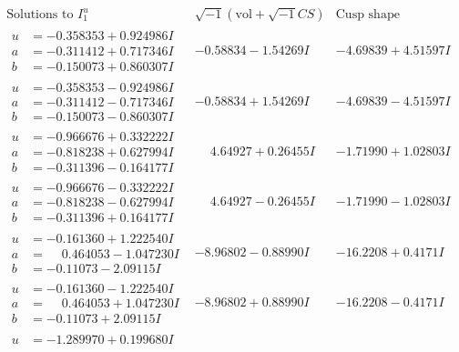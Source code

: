 \documentclass[1p]{elsarticle_modified}
\theoremstyle{definition}
\newcommand{\I}{\sqrt{-1}}
\begin{document}
$$\begin{array}{c|c|c}  
\text{Solutions to }I^u_{1}& \I (\text{vol} + \sqrt{-1}CS) & \text{Cusp shape}\\
 \hline 
\begin{aligned}
u &= -0.358353 + 0.924986 I \\
a &= -0.311412 + 0.717346 I \\
b &= -0.150073 + 0.860307 I\end{aligned}
 & -0.58834 - 1.54269 I & -4.69839 + 4.51597 I \\ \hline\begin{aligned}
u &= -0.358353 - 0.924986 I \\
a &= -0.311412 - 0.717346 I \\
b &= -0.150073 - 0.860307 I\end{aligned}
 & -0.58834 + 1.54269 I & -4.69839 - 4.51597 I \\ \hline\begin{aligned}
u &= -0.966676 + 0.332222 I \\
a &= -0.818238 + 0.627994 I \\
b &= -0.311396 - 0.164177 I\end{aligned}
 & \phantom{-}4.64927 + 0.26455 I & -1.71990 + 1.02803 I \\ \hline\begin{aligned}
u &= -0.966676 - 0.332222 I \\
a &= -0.818238 - 0.627994 I \\
b &= -0.311396 + 0.164177 I\end{aligned}
 & \phantom{-}4.64927 - 0.26455 I & -1.71990 - 1.02803 I \\ \hline\begin{aligned}
u &= -0.161360 + 1.222540 I \\
a &= \phantom{-}0.464053 - 1.047230 I \\
b &= -0.11073 - 2.09115 I\end{aligned}
 & -8.96802 - 0.88990 I & -16.2208 + 0.4171 I \\ \hline\begin{aligned}
u &= -0.161360 - 1.222540 I \\
a &= \phantom{-}0.464053 + 1.047230 I \\
b &= -0.11073 + 2.09115 I\end{aligned}
 & -8.96802 + 0.88990 I & -16.2208 - 0.4171 I \\ \hline\begin{aligned}
u &= -1.289970 + 0.199680 I \\

\end{aligned}
\end{array}$$
\end{document}
